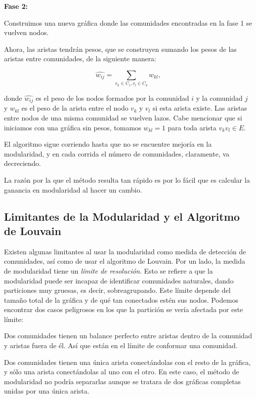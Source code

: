 \documentclass[conference]{IEEEtran}
\begin{document}
\begin{compactenum}
\item[] \textbf{Fase 2:}
\item Construimos una nueva gráfica donde las comunidades encontradas en la fase 1 se vuelven nodos. 
\item Ahora, las aristas tendrán pesos, que se construyen sumando los pesos de las aristas entre comunidades, de la siguiente manera:

    $$\hat{w_{ij}} = \sum_{v_{k} \in C_{i}, v_{l} \in C_{k}} w_{kl} ,$$

donde $\hat{w_{ij}}$ es el peso de los nodos formados por la comunidad $i$ y la comunidad $j$ y $w_{kl}$ es el peso de la arista entre el nodo $v_k$ y $v_l$ si esta arista existe. Las aristas entre nodos de una misma comunidad se vuelven lazos. Cabe mencionar que si iniciamos con una gráfica sin pesos, tomamos $w_{kl}=1$ para toda arista $v_kv_l\in E$.
\end{compactenum}
\medskip

El algoritmo sigue corriendo hasta que no se encuentre mejoría en la modularidad, y en cada corrida el número de comunidades, claramente, va decreciendo. 

La razón por la que el método resulta tan rápido es por lo fácil que es calcular la ganancia en modularidad al hacer un cambio. 

\subsection{Limitantes de la Modularidad y el Algoritmo de Louvain}

Existen algunas limitantes al usar la modularidad como medida de detección de comunidades, así como de usar el algoritmo de Louvain. Por un lado, la medida de modularidad tiene un \textit{límite de resolución}. Esto se refiere a que la modularidad puede ser incapaz de identificar comunidades naturales, dando particiones muy gruesas, es decir, sobreagrupando. Este límite depende del tamaño total de la gráfica y de qué tan conectados estén sus nodos. Podemos encontrar dos casos peligrosos en los que la partición se vería afectada por este límite:
\begin{compactenum}
    \item Dos comunidades tienen un balance perfecto entre aristas dentro de la comunidad y aristas fuera de él. Así que están en el límite de conformar una comunidad.
    \item Dos comunidades tienen una única arista conectándolas con el resto de la gráfica, y sólo una arista conectándolas al uno con el otro. En este caso, el método de modularidad no podría separarlas aunque se tratara de dos gráficas completas unidas por una única arista.
\end{compactenum}
\end{document}
